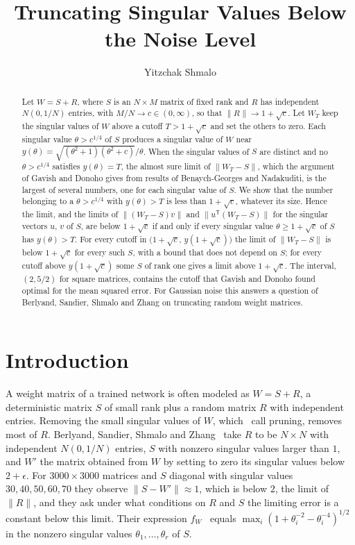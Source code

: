 \documentclass[11pt]{amsart}
\title[Truncating singular values below the noise level]{Truncating Singular Values Below the Noise Level}
\author[Yitzchak Shmalo]{Yitzchak Shmalo}
\theoremstyle{remark}
\numberwithin{equation}{section}
\begin{document}
\begin{abstract}
Let $W=S+R$, where $S$ is an $N\times M$ matrix of fixed rank and $R$ has independent $N(0,1/N)$ entries, with $M/N\to c\in(0,\infty)$, so that $\|R\|\to1+\sqrt c$. Let $W_T$ keep the singular values of $W$ above a cutoff $T>1+\sqrt c$ and set the others to zero. Each singular value $\theta>c^{1/4}$ of $S$ produces a singular value of $W$ near $y(\theta)=\sqrt{(\theta^2+1)(\theta^2+c)}/\theta$. When the singular values of $S$ are distinct and no $\theta>c^{1/4}$ satisfies $y(\theta)=T$, the almost sure limit of $\|W_T-S\|$, which the argument of Gavish and Donoho gives from results of Benaych-Georges and Nadakuditi, is the largest of several numbers, one for each singular value of $S$. We show that the number belonging to a $\theta>c^{1/4}$ with $y(\theta)>T$ is less than $1+\sqrt c$, whatever its size. Hence the limit, and the limits of $\|(W_T-S)v\|$ and $\|u^{\mathsf T}(W_T-S)\|$ for the singular vectors $u$, $v$ of $S$, are below $1+\sqrt c$ if and only if every singular value $\theta\ge1+\sqrt c$ of $S$ has $y(\theta)>T$. For every cutoff in $\bigl(1+\sqrt c,\,y(1+\sqrt c)\bigr)$ the limit of $\|W_T-S\|$ is below $1+\sqrt c$ for every such $S$, with a bound that does not depend on $S$; for every cutoff above $y(1+\sqrt c)$ some $S$ of rank one gives a limit above $1+\sqrt c$. The interval, $(2,5/2)$ for square matrices, contains the cutoff that Gavish and Donoho found optimal for the mean squared error. For Gaussian noise this answers a question of Berlyand, Sandier, Shmalo and Zhang on truncating random weight matrices.
\end{abstract}
\maketitle

\section{Introduction}\label{sec:intro}
A weight matrix of a trained network is often modeled as $W=S+R$, a deterministic matrix $S$ of small rank plus a random matrix $R$ with independent entries. Removing the small singular values of $W$, which~\cite{BSSZ} call pruning, removes most of $R$. Berlyand, Sandier, Shmalo and Zhang~\cite[Example~5.5]{BSSZ} take $R$ to be $N\times N$ with independent $N(0,1/N)$ entries, $S$ with nonzero singular values larger than $1$, and $W'$ the matrix obtained from $W$ by setting to zero its singular values below $2+\epsilon$. For $3000\times3000$ matrices and $S$ diagonal with singular values $30,40,50,60,70$ they observe $\|S-W'\|\approx1$, which is below $2$, the limit of $\|R\|$, and they ask under what conditions on $R$ and $S$ the limiting error is a constant below this limit. Their expression $f_W$~\cite[(37)]{BSSZ} equals $\max_i(1+\theta_i^{-2}-\theta_i^{-4})^{1/2}$ in the nonzero singular values $\theta_1,\dots,\theta_r$ of $S$.
\end{document}
